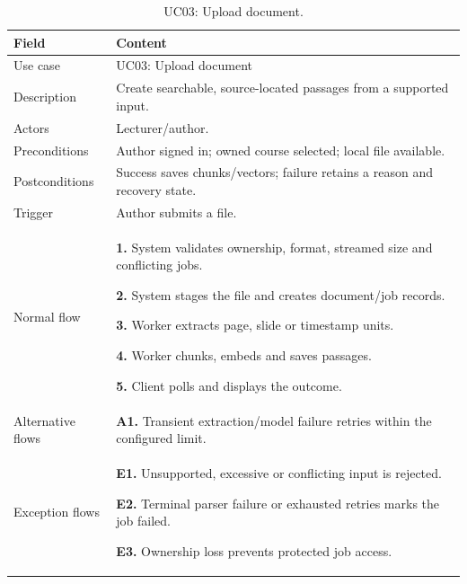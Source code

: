 \begin{table}[H]\centering\footnotesize{}\renewcommand{\arraystretch}{1.05}
\caption{UC03: Upload document.}\label{tab:uc-03}
\begin{tabular}{|p{2.8cm}|p{11.9cm}|}\hline
\textbf{Field} & \textbf{Content}\\\hline
Use case & UC03: Upload document\\\hline
Description & Create searchable, source-located passages from a supported input.\\\hline
Actors & Lecturer/author.\\\hline
Preconditions & Author signed in; owned course selected; local file available.\\\hline
Postconditions & Success saves chunks/vectors; failure retains a reason and recovery state.\\\hline
Trigger & Author submits a file.\\\hline
Normal flow & \textbf{1.} System validates ownership, format, streamed size and conflicting jobs.\par \textbf{2.} System stages the file and creates document/job records.\par \textbf{3.} Worker extracts page, slide or timestamp units.\par \textbf{4.} Worker chunks, embeds and saves passages.\par \textbf{5.} Client polls and displays the outcome.\\\hline
Alternative flows & \textbf{A1.} Transient extraction/model failure retries within the configured limit.\\\hline
Exception flows & \textbf{E1.} Unsupported, excessive or conflicting input is rejected.\par \textbf{E2.} Terminal parser failure or exhausted retries marks the job failed.\par \textbf{E3.} Ownership loss prevents protected job access.\\\hline
\end{tabular}\end{table}

